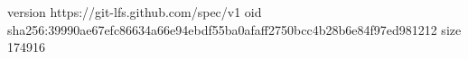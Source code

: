 version https://git-lfs.github.com/spec/v1
oid sha256:39990ae67efc86634a66e94ebdf55ba0afaff2750bcc4b28b6e84f97ed981212
size 174916
